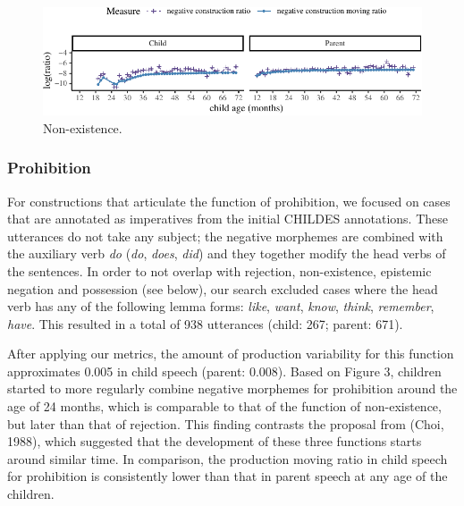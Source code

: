 \documentclass[10pt, letterpaper]{article}
\newenvironment{CodeChunk}{}{}
\begin{document}
\begin{figure}[h]

\begin{CodeChunk}


\begin{center}\includegraphics{figs/existence-1} \end{center}

\end{CodeChunk}
\caption[This image spans both columns]{Non-existence.}\label{fig:non-existence}
\end{figure}

\hypertarget{prohibition}{%
\subsubsection{Prohibition}\label{prohibition}}

For constructions that articulate the function of prohibition, we
focused on cases that are annotated as imperatives from the initial
CHILDES annotations. These utterances do not take any subject; the
negative morphemes are combined with the auxiliary verb \emph{do}
(\emph{do}, \emph{does}, \emph{did}) and they together modify the head
verbs of the sentences. In order to not overlap with rejection,
non-existence, epistemic negation and possession (see below), our search
excluded cases where the head verb has any of the following lemma forms:
\emph{like}, \emph{want}, \emph{know}, \emph{think}, \emph{remember},
\emph{have}. This resulted in a total of 938 utterances (child: 267;
parent: 671).

After applying our metrics, the amount of production variability for
this function approximates 0.005 in child speech (parent: 0.008). Based
on Figure 3, children started to more regularly combine negative
morphemes for prohibition around the age of 24 months, which is
comparable to that of the function of non-existence, but later than that
of rejection. This finding contrasts the proposal from (Choi, 1988),
which suggested that the development of these three functions starts
around similar time. In comparison, the production moving ratio in child
speech for prohibition is consistently lower than that in parent speech
at any age of the children.
\end{document}
